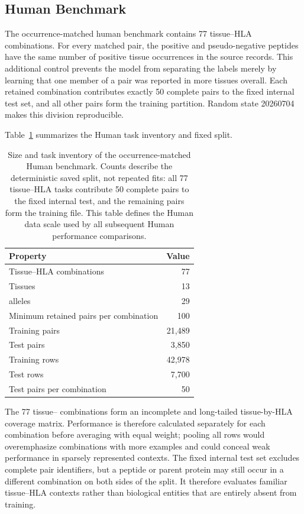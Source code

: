 \subsection{Human Benchmark}

The occurrence-matched human benchmark contains 77 tissue--HLA combinations. For every matched pair, the positive and pseudo-negative peptides have the same number of positive tissue occurrences in the source records. This additional control prevents the model from separating the labels merely by learning that one member of a pair was reported in more tissues overall. Each retained combination contributes exactly 50 complete pairs to the fixed internal test set, and all other pairs form the training partition. Random state 20260704 makes this division reproducible.

Table~\ref{tab:human-benchmark-stats} summarizes the Human task inventory and fixed split.

\begin{table}[tbp]
\centering
\caption{Size and task inventory of the occurrence-matched Human benchmark. Counts describe the deterministic saved split, not repeated fits: all 77 tissue--HLA tasks contribute 50 complete pairs to the fixed internal test, and the remaining pairs form the training file. This table defines the Human data scale used by all subsequent Human performance comparisons.}
\label{tab:human-benchmark-stats}
\small
\begin{tabularx}{\columnwidth}{@{}>{\raggedright\arraybackslash}Xr@{}}
\toprule
Property & Value \\
\midrule
Tissue--HLA combinations & 77 \\
Tissues & 13 \\
\plainHLA{} alleles & 29 \\
Minimum retained pairs per combination & 100 \\
Training pairs & 21,489 \\
Test pairs & 3,850 \\
Training rows & 42,978 \\
Test rows & 7,700 \\
Test pairs per combination & 50 \\
\bottomrule
\end{tabularx}
\end{table}

The 77 tissue--\plainHLA{} combinations form an incomplete and long-tailed tissue-by-HLA coverage matrix. Performance is therefore calculated separately for each combination before averaging with equal weight; pooling all rows would overemphasize combinations with more examples and could conceal weak performance in sparsely represented contexts. The fixed internal test set excludes complete pair identifiers, but a peptide or parent protein may still occur in a different combination on both sides of the split. It therefore evaluates familiar tissue--HLA contexts rather than biological entities that are entirely absent from training.

